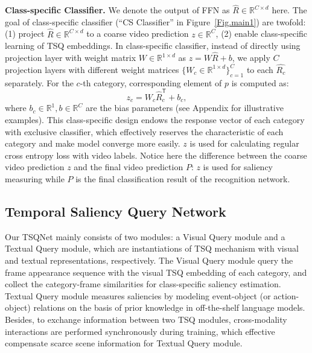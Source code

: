 \documentclass[runningheads]{llncs}
\newcommand{\figref}[1]{Figure~\ref{#1}}
\begin{document}
\noindent\textbf{Class-specific Classifier.}
We denote the output of FFN as $\hat{R} \in \mathbb{R}^{C\times d}$ here. The goal of class-specific classifier (``CS Classifier'' in \figref{Fig.main1}) are twofold: (1) project $\hat{R} \in \mathbb{R}^{C\times d}$ to a coarse video prediction $z\in \mathbb{R}^{C}$, (2) enable class-specific learning of TSQ embeddings. In class-specific classifier, instead of directly using projection layer with weight matrix $W \in \mathbb{R}^{1\times d}$ as $z=W\hat{R}+b$, we apply $C$ projection layers with different weight matrices $\{W_c \in \mathbb{R}^{1\times d}\}_{c=1}^C$ to each $\hat{R_c}$ separately. For the $c$-th category, corresponding element of $p$ is computed as: 
\begin{equation}
z_c = W_{c} \hat{R}_{c}^{\mathsf{T}} + b_c,
\end{equation}\label{spfc}
where $b_c \in \mathbb{R}^{1}, b \in \mathbb{R}^{C}$ are the bias parameters (see Appendix for illustrative examples).
This class-specific design endows the response vector of each category with exclusive classifier, which effectively reserves the characteristic of each category and make model converge more easily. $z$ is used for calculating regular cross entropy loss with video labels. Notice here the difference between the coarse video prediction $z$ and the final video prediction $P$: $z$ is used for saliency measuring while $P$ is the final classification result of the recognition network.




\subsection{Temporal Saliency Query Network}\label{TSQNet}
Our TSQNet mainly consists of two modules: a Visual Query module and a Textual Query module, which are instantiations of TSQ mechanism with visual and textual representations, respectively. The Visual Query module query the frame appearance sequence with the visual TSQ embedding of each category, and collect the category-frame similarities for class-specific saliency estimation. Textual Query module measures saliencies by modeling event-object (or action-object) relations on the basis of prior knowledge in off-the-shelf language models. Besides, to exchange information between two TSQ modules, cross-modality interactions are performed synchronously during training, which effective compensate scarce scene information for Textual Query module. 
\end{document}

